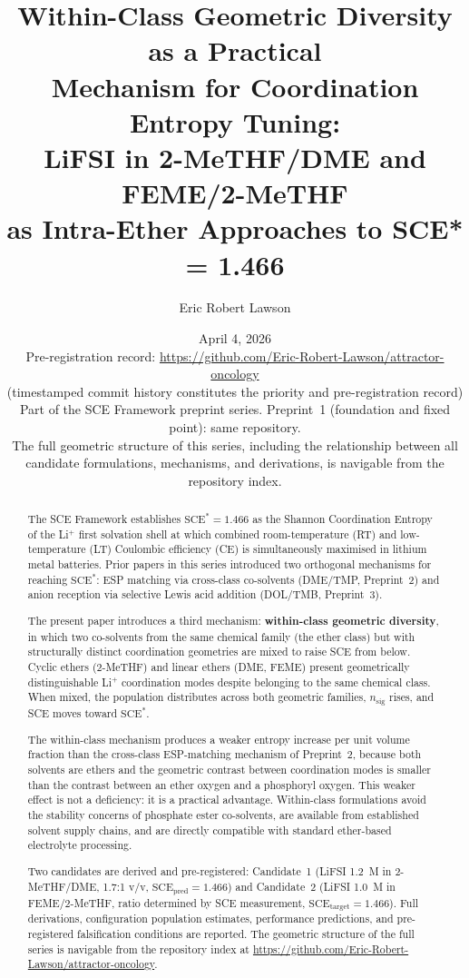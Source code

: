 \documentclass[11pt]{article}
\title{\textbf{Within-Class Geometric Diversity as a Practical\\
Mechanism for Coordination Entropy Tuning:\\
LiFSI in 2-MeTHF/DME and FEME/2-MeTHF\\
as Intra-Ether Approaches to SCE* = 1.466}}
\author[1]{Eric Robert Lawson}
\affil[1]{Independent Researcher, OrganismCore Initiative\\
\texttt{ORCID: 0009-0002-0414-6544}\\
Repository: \url{https://github.com/Eric-Robert-Lawson/attractor-oncology}}
\date{April 4, 2026\\
\small Pre-registration record:
\url{https://github.com/Eric-Robert-Lawson/attractor-oncology}\\
\small (timestamped commit history constitutes the priority
and pre-registration record)\\
\small Part of the SCE Framework preprint series.
Preprint~1 (foundation and fixed point):
same repository.\\
\small The full geometric structure of this series,
including the relationship between all candidate formulations,
mechanisms, and derivations, is navigable from the repository
index.}
\theoremstyle{plain}
\theoremstyle{definition}
\theoremstyle{remark}
\begin{document}
\maketitle

\begin{abstract}
The SCE Framework establishes $\mathrm{SCE}^{*} = 1.466$ as the Shannon
Coordination Entropy of the Li$^+$ first solvation shell at which
combined room-temperature (RT) and low-temperature (LT) Coulombic
efficiency (CE) is simultaneously maximised in lithium metal batteries.
Prior papers in this series introduced two orthogonal mechanisms for
reaching $\mathrm{SCE}^{*}$: ESP matching via cross-class co-solvents
(DME/TMP, Preprint~2) and anion reception via selective Lewis acid
addition (DOL/TMB, Preprint~3).

The present paper introduces a third mechanism: \textbf{within-class
geometric diversity}, in which two co-solvents from the same chemical
family (the ether class) but with structurally distinct coordination
geometries are mixed to raise SCE from below.  Cyclic ethers (2-MeTHF)
and linear ethers (DME, FEME) present geometrically distinguishable
Li$^+$ coordination modes despite belonging to the same chemical class.
When mixed, the population distributes across both geometric families,
$n_{\mathrm{sig}}$ rises, and SCE moves toward $\mathrm{SCE}^{*}$.

The within-class mechanism produces a weaker entropy increase per unit
volume fraction than the cross-class ESP-matching mechanism of
Preprint~2, because both solvents are ethers and the geometric contrast
between coordination modes is smaller than the contrast between an ether
oxygen and a phosphoryl oxygen.  This weaker effect is not a deficiency:
it is a practical advantage.  Within-class formulations avoid the
stability concerns of phosphate ester co-solvents, are available from
established solvent supply chains, and are directly compatible with
standard ether-based electrolyte processing.

Two candidates are derived and pre-registered:
Candidate~1 (LiFSI 1.2~M in 2-MeTHF/DME, 1.7:1 v/v,
$\mathrm{SCE}_{\mathrm{pred}} = 1.466$) and
Candidate~2 (LiFSI 1.0~M in FEME/2-MeTHF, ratio determined by
SCE measurement, $\mathrm{SCE}_{\mathrm{target}} = 1.466$).
Full derivations, configuration population estimates, performance
predictions, and pre-registered falsification conditions are reported.
The geometric structure of the full series is navigable from the
repository index at
\url{https://github.com/Eric-Robert-Lawson/attractor-oncology}.
\end{abstract}
\end{document}
